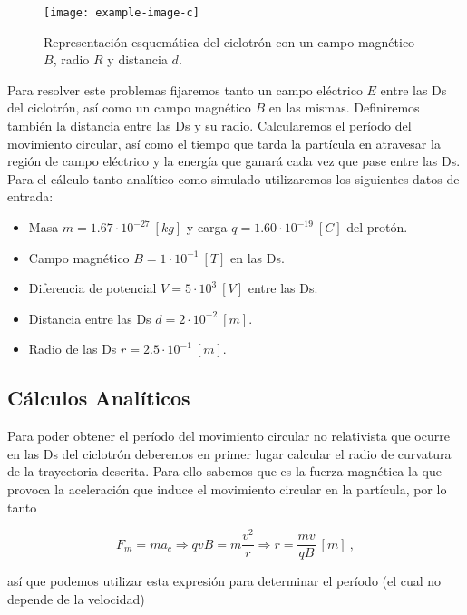 \documentclass[journal]{IEEEtran}
\begin{document}
\begin{figure}[!htb]
    \texttt{[image: example-image-c]}
    \caption{Representación esquemática del ciclotrón con un campo magnético $B$, radio $R$ y distancia $d$.}
    \label{fig:ciclotron}
\end{figure}

Para resolver este problemas fijaremos tanto un campo eléctrico $E$ entre las Ds del ciclotrón, así como un campo magnético $B$ en las mismas. Definiremos también la distancia entre las Ds y su radio. Calcularemos el período del movimiento circular, así como el tiempo que tarda la partícula en atravesar la región de campo eléctrico y la energía que ganará cada vez que pase entre las Ds. Para el cálculo tanto analítico como simulado utilizaremos los siguientes datos de entrada:

\begin{itemize}
    \item Masa $m = 1.67\cdot 10^{-27}~[kg]$ y carga $q = 1.60\cdot 10^{-19}~[C]$ del protón.
    \item Campo magnético $B = 1\cdot 10^{-1}~[T]$ en las Ds.
    \item Diferencia de potencial $V = 5\cdot 10^3~[V]$ entre las Ds.
    \item Distancia entre las Ds $d = 2\cdot 10^{-2}~[m]$.
    \item Radio de las Ds $r = 2.5\cdot 10^{-1}~[m]$.
\end{itemize}

\newpage

\subsection{Cálculos Analíticos}

Para poder obtener el período del movimiento circular no relativista que ocurre en las Ds del ciclotrón deberemos en primer lugar calcular el radio de curvatura de la trayectoria descrita. Para ello sabemos que es la fuerza magnética la que provoca la aceleración que induce el movimiento circular en la partícula, por lo tanto

\begin{equation}
F_m = ma_c \Rightarrow qvB = m \displaystyle\frac{v^2}{r} \Rightarrow r = \displaystyle\frac{mv}{qB}~[m]~,
\end{equation}

así que podemos utilizar esta expresión para determinar el período (el cual no depende de la velocidad)
\end{document}
